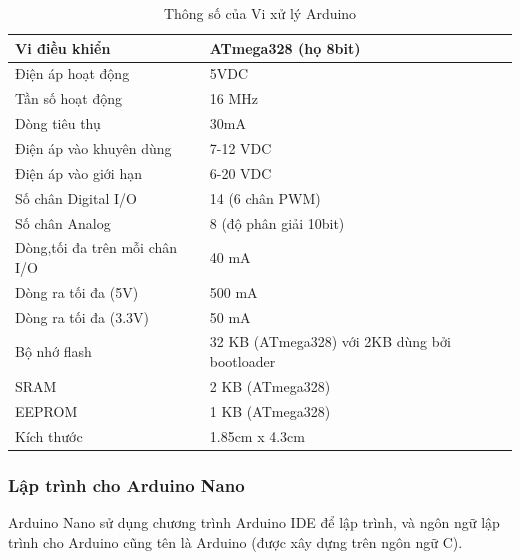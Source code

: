 \begin{center}
	\begin{table}[]
		\centering
		\caption{Thông số của Vi xử lý Arduino}
		\label{table:thongsoarduino}
		\begin{tabular}{|l|l|}
			\hline
			Vi điều khiển                 & ATmega328 (họ 8bit)                           \\ \hline
			Điện áp hoạt động             & 5VDC                                          \\ \hline
			Tần số hoạt động              & 16 MHz                                        \\ \hline
			Dòng tiêu thụ                 & 30mA                                          \\ \hline
			Điện áp vào khuyên dùng       & 7-12 VDC                                      \\ \hline
			Điện áp vào giới hạn          & 6-20 VDC                                      \\ \hline
			Số chân Digital I/O           & 14 (6 chân PWM)                               \\ \hline
			Số chân Analog                & 8 (độ phân giải 10bit)                        \\ \hline
			Dòng,tối đa trên mỗi chân I/O & 40 mA                                         \\ \hline
			Dòng ra tối đa (5V)           & 500 mA                                        \\ \hline
			Dòng ra tối đa (3.3V)         & 50 mA                                         \\ \hline
			Bộ nhớ flash                  & 32 KB (ATmega328) với 2KB dùng bởi bootloader \\ \hline
			SRAM                          & 2 KB (ATmega328)                              \\ \hline
			EEPROM                        & 1 KB (ATmega328)                              \\ \hline
			Kích thước                    & 1.85cm x 4.3cm                                \\ \hline
		\end{tabular}
	\end{table}
\end{center}


\subsubsection*{Lập trình cho Arduino Nano}
Arduino Nano sử dụng chương trình Arduino IDE để lập trình, và ngôn ngữ lập trình cho Arduino cũng tên là Arduino (được xây dựng trên ngôn ngữ C). 


